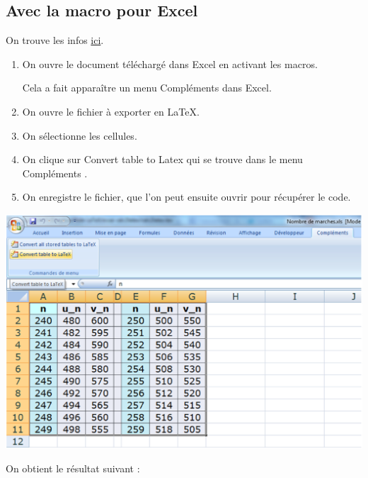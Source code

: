 \documentclass[12pt,french]{article}
\begin{document}
\begin{spacing}{1.2}
\section{Avec la macro pour Excel}

On trouve les infos \href{http://www.ctan.org/tex-archive/support/excel2latex/}{ici}.

\begin{enumerate}[label=\arabic*.]
\item On ouvre le document téléchargé dans Excel en activant les macros.

Cela a fait apparaître un menu \og Compléments \fg{} dans Excel.

\item On ouvre le fichier à \og exporter \fg{} en \LaTeX.

\item On sélectionne les cellules.

\item On clique sur \og Convert table to Latex \fg{} qui se trouve dans le menu \og Compléments \fg{}.

\item On enregistre le fichier, que l'on peut ensuite ouvrir pour récupérer le code.

\end{enumerate}

\begin{center}
\includegraphics[width=\textwidth]{excel2latex}
\end{center}

On obtient le résultat suivant :


\end{spacing}
\end{document}
